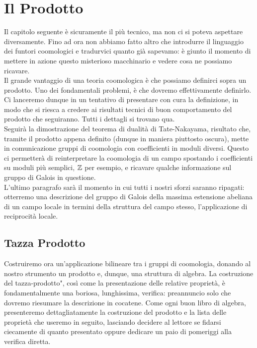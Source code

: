 \chapter{Il Prodotto}
Il capitolo seguente è sicuramente il più tecnico, ma non ci si poteva aspettare diversamente. Fino ad ora non abbiamo fatto altro che introdurre il linguaggio dei funtori coomologici e tradurvici quanto già sapevamo: è giunto il momento di mettere in azione questo misterioso macchinario e vedere cosa ne possiamo ricavare.\\

Il grande vantaggio di una teoria coomologica è che possiamo definirci sopra un prodotto. Uno dei fondamentali problemi, è che dovremo effettivamente definirlo. Ci lanceremo dunque in un tentativo di presentare con cura la definizione, in modo che si riesca a credere ai risultati tecnici di buon comportamento del prodotto che seguiranno. Tutti i dettagli si trovano qua. \todo[ref] \\

Seguirà la dimostrazione del teorema di dualità di Tate-Nakayama, risultato che, tramite il prodotto appena definito (dunque in maniera piuttosto oscura), mette in comunicazione gruppi di coomologia con coefficienti in moduli diversi. Questo ci permetterà di reinterpretare la coomologia di un campo spostando i coefficienti su moduli più semplici, $ \mathbb{Z} $ per esempio, e ricavare qualche informazione sul gruppo di Galois in questione. \\

L'ultimo paragrafo sarà il momento in cui tutti i nostri sforzi saranno ripagati: otterremo una descrizione del gruppo di Galois della massima estensione abeliana di un campo locale in termini della struttura del campo stesso, l'applicazione di reciprocità locale.

\section{Tazza Prodotto}
Costruiremo ora un'applicazione bilineare tra i gruppi di coomologia, donando al nostro strumento un prodotto e, dunque, una struttura di algebra. La costruzione del \leftquote tazza-prodotto", così come la presentazione delle relative proprietà, è fondamentalmente una boriosa, lunghissima, verifica: preannuncio solo che dovremo riesumare la descrizione in cocatene. Come ogni buon libro di algebra, presenteremo dettagliatamente la costruzione del prodotto e la lista delle proprietà che useremo in seguito, lasciando decidere al lettore se fidarsi ciecamente di quanto presentato oppure dedicare un paio di pomeriggi alla verifica diretta. \\

